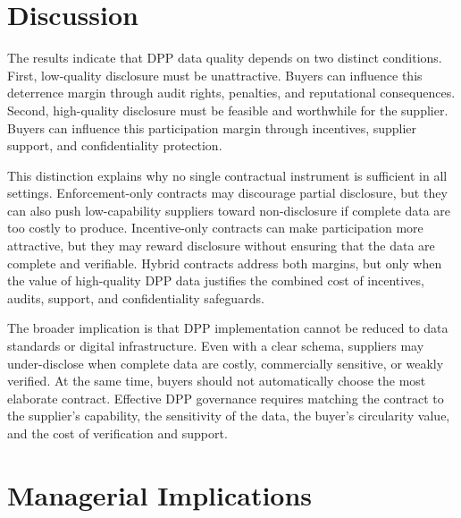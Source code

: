 \documentclass[final,5p,times,authoryear]{elsarticle}
\begin{document}
\FloatBarrier

\clearpage

\section{Discussion}

The results indicate that DPP data quality depends on two distinct conditions. First, low-quality disclosure must be unattractive. Buyers can influence this deterrence margin through audit rights, penalties, and reputational consequences. Second, high-quality disclosure must be feasible and worthwhile for the supplier. Buyers can influence this participation margin through incentives, supplier support, and confidentiality protection.

This distinction explains why no single contractual instrument is sufficient in all settings. Enforcement-only contracts may discourage partial disclosure, but they can also push low-capability suppliers toward non-disclosure if complete data are too costly to produce. Incentive-only contracts can make participation more attractive, but they may reward disclosure without ensuring that the data are complete and verifiable. Hybrid contracts address both margins, but only when the value of high-quality DPP data justifies the combined cost of incentives, audits, support, and confidentiality safeguards.

The broader implication is that DPP implementation cannot be reduced to data standards or digital infrastructure. Even with a clear schema, suppliers may under-disclose when complete data are costly, commercially sensitive, or weakly verified. At the same time, buyers should not automatically choose the most elaborate contract. Effective DPP governance requires matching the contract to the supplier's capability, the sensitivity of the data, the buyer's circularity value, and the cost of verification and support.

\section{Managerial Implications}
\end{document}
